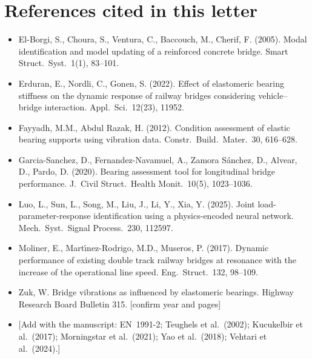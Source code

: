 \documentclass[11pt]{article}
\newcommand{\tbd}[1]{\textcolor{note}{\textsf{[#1]}}}
\begin{document}
\section{References cited in this letter}
{\small
\begin{itemize}[leftmargin=*,label={}]
\item El-Borgi, S., Choura, S., Ventura, C., Baccouch, M., Cherif, F. (2005). Modal identification and model updating of a reinforced concrete bridge. Smart Struct.\ Syst.\ 1(1), 83--101.
\item Erduran, E., Nordli, C., Gonen, S. (2022). Effect of elastomeric bearing stiffness on the dynamic response of railway bridges considering vehicle--bridge interaction. Appl.\ Sci.\ 12(23), 11952.
\item Fayyadh, M.M., Abdul Razak, H. (2012). Condition assessment of elastic bearing supports using vibration data. Constr.\ Build.\ Mater.\ 30, 616--628.
\item Garcia-Sanchez, D., Fernandez-Navamuel, A., Zamora S\'anchez, D., Alvear, D., Pardo, D. (2020). Bearing assessment tool for longitudinal bridge performance. J.\ Civil Struct.\ Health Monit.\ 10(5), 1023--1036.
\item Luo, L., Sun, L., Song, M., Liu, J., Li, Y., Xia, Y. (2025). Joint load-parameter-response identification using a physics-encoded neural network. Mech.\ Syst.\ Signal Process.\ 230, 112597.
\item Moliner, E., Mart\'{\i}nez-Rodrigo, M.D., Museros, P. (2017). Dynamic performance of existing double track railway bridges at resonance with the increase of the operational line speed. Eng.\ Struct.\ 132, 98--109.
\item Zuk, W. Bridge vibrations as influenced by elastomeric bearings. Highway Research Board Bulletin 315. \tbd{confirm year and pages}
\item \tbd{Add with the manuscript: EN~1991-2; Teughels et al.\ (2002); Kucukelbir et al.\ (2017); Morningstar et al.\ (2021); Yao et al.\ (2018); Vehtari et al.\ (2024).}
\end{itemize}
}
\end{document}
